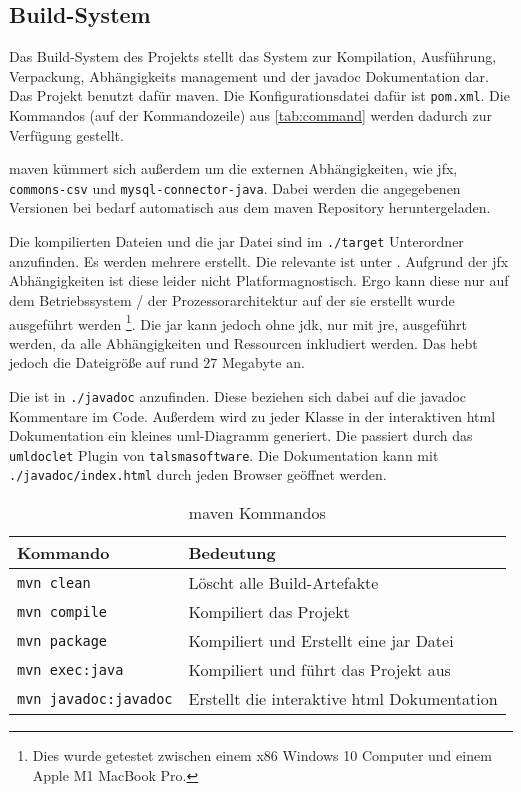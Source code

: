 \subsection{Build-System}

Das Build-System des Projekts stellt das System zur Kompilation, Ausführung, Verpackung, Abhängigkeits management und der \gls{javadoc} Dokumentation dar.
Das Projekt benutzt dafür \gls{maven}.
Die Konfigurationsdatei dafür ist \texttt{pom.xml}.
Die Kommandos (auf der Kommandozeile) aus \autoref{tab:command} werden dadurch zur Verfügung gestellt.

\gls{maven} kümmert sich außerdem um die externen Abhängigkeiten, wie \gls{jfx}, \texttt{commons-csv} und \texttt{mysql-connector-java}.
Dabei werden die angegebenen Versionen bei bedarf automatisch aus dem \gls{maven} Repository heruntergeladen.

Die kompilierten Dateien und die \gls{jar} Datei sind im \texttt{./target} Unterordner anzufinden.
Es werden mehrere  erstellt.
Die relevante ist unter \texttt{}.
Aufgrund der \gls{jfx} Abhängigkeiten ist diese leider nicht Platformagnostisch.
Ergo kann diese nur auf dem Betriebssystem / der Prozessorarchitektur auf der sie erstellt wurde ausgeführt werden \footnote{Dies wurde getestet zwischen einem x86 Windows 10 Computer und einem Apple M1 MacBook Pro.}.
Die \gls{jar} kann jedoch ohne \gls{jdk}, nur mit \gls{jre}, ausgeführt werden, da alle Abhängigkeiten und Ressourcen inkludiert werden.
Das hebt jedoch die Dateigröße auf rund $27$ Megabyte an.

Die  ist in \texttt{./javadoc} anzufinden.
Diese beziehen sich dabei auf die \gls{javadoc} Kommentare im Code.
Außerdem wird zu jeder Klasse in der interaktiven \gls{html} Dokumentation ein kleines \gls{uml}-Diagramm generiert.
Die passiert durch das \texttt{umldoclet} Plugin von \texttt{talsmasoftware}.
Die Dokumentation kann mit \texttt{./javadoc/index.html} durch jeden Browser geöffnet werden.

\begin{table}[h]
\centering
\begin{tabularx}{0.8\textwidth}{|l|X|}
    \hline
    \textbf{Kommando} & \textbf{Bedeutung} \\
    \hline
    \texttt{mvn clean} & Löscht alle Build-Artefakte \\
    \texttt{mvn compile} & Kompiliert das Projekt \\
    \texttt{mvn package} & Kompiliert und Erstellt eine \gls{jar} Datei \\
    \texttt{mvn exec:java} & Kompiliert und führt das Projekt aus \\
    \texttt{mvn javadoc:javadoc} & Erstellt die interaktive \acrshort{html} Dokumentation \\
    \hline
\end{tabularx}
\caption{\gls{maven} Kommandos}
\label{tab:command}
\end{table}
